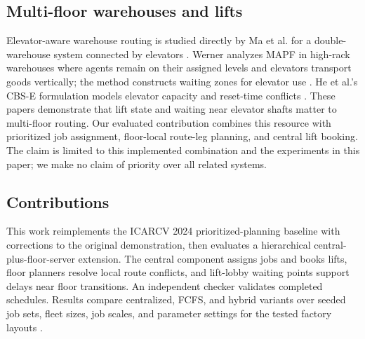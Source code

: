\subsection{Multi-floor warehouses and lifts}

Elevator-aware warehouse routing is studied directly by Ma et al. for a
double-warehouse system connected by elevators \cite{ma2014}. Werner analyzes
MAPF in high-rack warehouses where agents remain on their assigned levels
and elevators transport goods vertically; the method constructs waiting
zones for elevator use \cite{werner2025}. He et al.'s CBS-E formulation
models elevator capacity and reset-time conflicts \cite{he2026}. These
papers demonstrate that lift state and waiting near elevator shafts matter
to multi-floor routing. Our evaluated contribution combines this resource
with prioritized job assignment, floor-local route-leg planning, and
central lift booking. The claim is limited to this implemented combination
and the experiments in this paper; we make no claim of priority over all
related systems.

\subsection{Contributions}

This work reimplements the ICARCV 2024 prioritized-planning baseline with
corrections to the original demonstration, then evaluates a hierarchical
central-plus-floor-server extension. The central component assigns jobs and
books lifts, floor planners resolve local route conflicts, and lift-lobby
waiting points support delays near floor transitions. An independent checker
validates completed schedules. Results compare centralized, FCFS, and hybrid
variants over seeded job sets, fleet sizes, job scales, and parameter settings
for the tested factory layouts \cite{projectRepo}.
